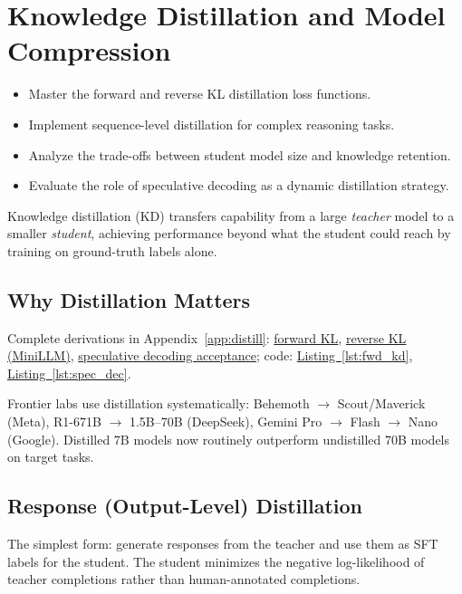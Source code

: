 \chapter{Knowledge Distillation and Model Compression}
\minitoc

\begin{chapteroverview}
  \begin{itemize}
    \item Master the forward and reverse KL distillation loss functions.
    \item Implement sequence-level distillation for complex reasoning tasks.
    \item Analyze the trade-offs between student model size and knowledge retention.
    \item Evaluate the role of speculative decoding as a dynamic distillation strategy.
  \end{itemize}
\end{chapteroverview}

Knowledge distillation (KD) transfers capability from a large \emph{teacher} model to a smaller \emph{student}, achieving performance beyond what the student could reach by training on ground-truth labels alone.

\section{Why Distillation Matters}

Complete derivations in Appendix~\ref{app:distill}: \hyperref[form:fwd_kd]{forward KL}, \hyperref[form:rev_kd]{reverse KL (MiniLLM)}, \hyperref[form:spec_dec]{speculative decoding acceptance}; code: \hyperref[lst:fwd_kd]{Listing~\ref*{lst:fwd_kd}}, \hyperref[lst:spec_dec]{Listing~\ref*{lst:spec_dec}}.

Frontier labs use distillation systematically: Behemoth $\rightarrow$ Scout/Maverick (Meta), R1-671B $\rightarrow$ 1.5B--70B (DeepSeek), Gemini Pro $\rightarrow$ Flash $\rightarrow$ Nano (Google). Distilled 7B models now routinely outperform undistilled 70B models on target tasks.

\section{Response (Output-Level) Distillation}

The simplest form: generate responses from the teacher and use them as SFT labels for the student. The student minimizes the negative log-likelihood of teacher completions rather than human-annotated completions.

